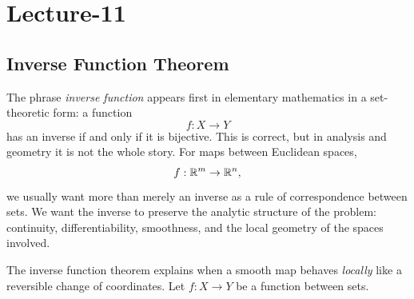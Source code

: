 \newpage
\section{Lecture-11}
\subsection{Inverse Function Theorem}
The phrase \emph{inverse function} appears first in elementary mathematics in a set-theoretic form: a function
\[
f:X\to Y
\]
has an inverse if and only if it is bijective. This is correct, but in analysis and geometry it is not the whole story. For maps between Euclidean spaces,
\[
f:\mathbb{R}^m\to\mathbb{R}^n,
\]
we usually want more than merely an inverse as a rule of correspondence between sets. We want the inverse to preserve the analytic structure of the problem: continuity, differentiability, smoothness, and the local geometry of the spaces involved.

The inverse function theorem explains when a smooth map behaves \emph{locally} like a reversible change of coordinates.
Let \(f:X\to Y\) be a function between sets.

